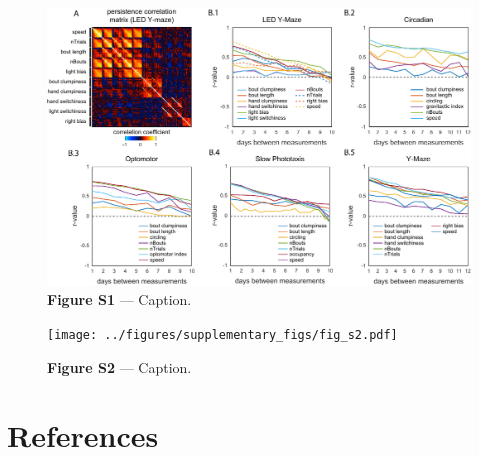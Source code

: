 \documentclass[12pt,letterpaper]{article}
\begin{document}
\begin{figure}[h!]
    \includegraphics[width=\textwidth]{../figures/supplementary_figs/fig_s1.pdf}
    \vspace{.05in}
    \caption*{\textbf{Figure S1} — Caption.}
\end{figure}
\clearpage

\begin{figure}[t!]
    \texttt{[image: ../figures/supplementary\_figs/fig\_s2.pdf]}
    \caption*{\textbf{Figure S2} — Caption.}
\end{figure}
\clearpage


\section{References}

\singlespacing

\end{document}
